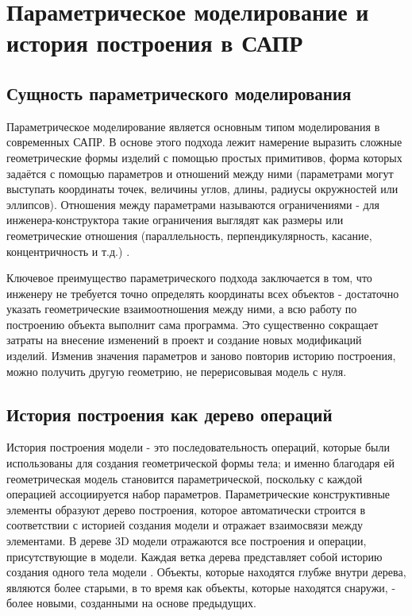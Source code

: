 
\section{Параметрическое моделирование и история построения в САПР}

\subsection{Сущность параметрического моделирования}

Параметрическое моделирование является основным типом моделирования в современных САПР. В основе этого подхода лежит намерение выразить сложные геометрические формы изделий с помощью простых примитивов, форма которых задаётся с помощью параметров и отношений между ними (параметрами могут выступать координаты точек, величины углов, длины, радиусы окружностей или эллипсов). Отношения между параметрами называются ограничениями - для инженера-конструктора такие ограничения выглядят как размеры или геометрические отношения (параллельность, перпендикулярность, касание, концентричность и т.д.) \cite{eclass2025}.

Ключевое преимущество параметрического подхода заключается в том, что инженеру не требуется точно определять координаты всех объектов - достаточно указать геометрические взаимоотношения между ними, а всю работу по построению объекта выполнит сама программа. Это существенно сокращает затраты на внесение изменений в проект и создание новых модификаций изделий. Изменив значения параметров и заново повторив историю построения, можно получить другую геометрию, не перерисовывая модель с нуля.

\subsection{История построения как дерево операций}

История построения модели - это последовательность операций, которые были использованы для создания геометрической формы тела; и именно благодаря ей геометрическая модель становится параметрической, поскольку с каждой операцией ассоциируется набор параметров. Параметрические конструктивные элементы образуют дерево построения, которое автоматически строится в соответствии с историей создания модели и отражает взаимосвязи между элементами. В дереве 3D модели отражаются все построения и операции, присутствующие в модели. Каждая ветка дерева представляет собой историю создания одного тела модели \cite{tflexcad15}. Объекты, которые находятся глубже внутри дерева, являются более старыми, в то время как объекты, которые находятся снаружи, - более новыми, созданными на основе предыдущих.

